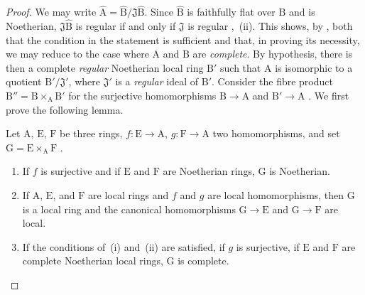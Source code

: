 \begin{proof}
We may write $\widehat{\mathrm{A}}=\widehat{\mathrm{B}}/\mathfrak{J}\widehat{\mathrm{B}}$. Since $\widehat{\mathrm{B}}$ is faithfully flat over $\mathrm{B}$ and is Noetherian, $\mathfrak{J}\widehat{\mathrm{B}}$ is regular if and only if $\mathfrak{J}$ is regular ,~(ii).
This shows, by , both that the condition in the statement is sufficient and that, in proving its necessity, we may reduce to the case where $\mathrm{A}$ and $\mathrm{B}$ are \emph{complete}.
By hypothesis, there is then a complete \emph{regular} Noetherian local ring $\mathrm{B}'$ such that $\mathrm{A}$ is isomorphic to a quotient $\mathrm{B}'/\mathfrak{J}'$, where $\mathfrak{J}'$ is a \emph{regular} ideal of $\mathrm{B}'$.
Consider the fibre product $\mathrm{B}''=\mathrm{B}\times_{\mathrm{A}}\mathrm{B}'$ for the surjective homomorphisms $\mathrm{B}\to\mathrm{A}$ and $\mathrm{B}'\to\mathrm{A}$ . We first prove the following lemma.

\begin{lemma}[19.3.2.1]
\label{IV.19.3.2.1}
Let $\mathrm{A}$, $\mathrm{E}$, $\mathrm{F}$ be three rings, $f:\mathrm{E}\to\mathrm{A}$, $g:\mathrm{F}\to\mathrm{A}$ two homomorphisms, and set $\mathrm{G}=\mathrm{E}\times_{\mathrm{A}}\mathrm{F}$ .
\begin{enumerate}[label=\textup{(\roman*)}]
  \item If $f$ is surjective and if $\mathrm{E}$ and $\mathrm{F}$ are Noetherian rings, $\mathrm{G}$ is Noetherian.
  \item If $\mathrm{A}$, $\mathrm{E}$, and $\mathrm{F}$ are local rings and $f$ and $g$ are local homomorphisms, then $\mathrm{G}$ is a local ring and the canonical homomorphisms $\mathrm{G}\to\mathrm{E}$ and $\mathrm{G}\to\mathrm{F}$ are local.
  \item If the conditions of~\textup{(i)} and~\textup{(ii)} are satisfied, if $g$ is surjective, if $\mathrm{E}$ and $\mathrm{F}$ are complete Noetherian local rings, $\mathrm{G}$ is complete.
\end{enumerate}
\end{lemma}


\end{proof}
